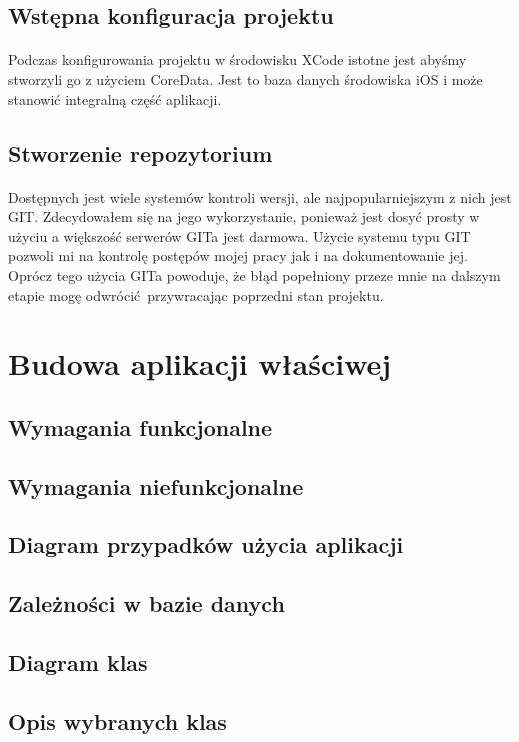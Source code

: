 \documentclass[11pt,twoside,a4paper]{report}
\begin{document}
\subsection{Wstępna konfiguracja projektu}
\paragraph{}Podczas konfigurowania projektu w środowisku XCode istotne jest abyśmy stworzyli go z użyciem CoreData. Jest to baza danych środowiska iOS i może stanowić integralną część aplikacji.   
\subsection{Stworzenie repozytorium}
\paragraph{}Dostępnych jest wiele systemów kontroli wersji, ale najpopularniejszym z nich jest GIT. Zdecydowałem się na jego wykorzystanie, ponieważ jest dosyć prosty w użyciu a większość serwerów GITa jest darmowa. Użycie systemu typu GIT pozwoli mi na kontrolę postępów mojej pracy jak i na dokumentowanie jej. Oprócz tego użycia GITa powoduje, że błąd popełniony przeze mnie na dalszym etapie mogę odwrócić przywracając poprzedni stan projektu.
\section{Budowa aplikacji właściwej}
\subsection{Wymagania funkcjonalne}
\subsection{Wymagania niefunkcjonalne}
\subsection{Diagram przypadków użycia aplikacji}
\subsection{Zależności w bazie danych}
\subsection{Diagram klas}
\subsection{Opis wybranych klas}
\end{document}
